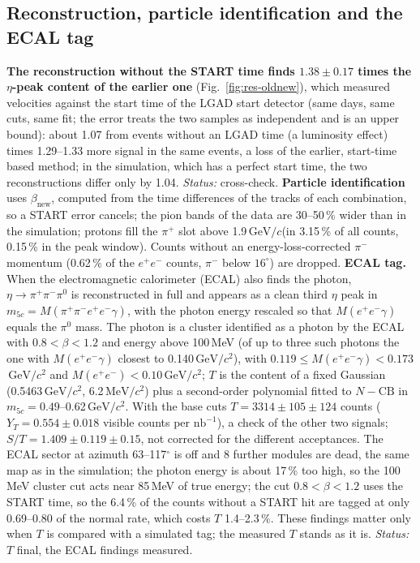 \documentclass[11pt,a4paper]{article}
\newcommand{\pip}{\ensuremath{\pi^{+}}\xspace}
\newcommand{\pim}{\ensuremath{\pi^{-}}\xspace}
\newcommand{\piz}{\ensuremath{\pi^{0}}\xspace}
\newcommand{\ee}{\ensuremath{e^{+}e^{-}}\xspace}
\newcommand{\pipi}{\ensuremath{\pi^{+}\pi^{-}}\xspace}
\newcommand{\ppee}{\ensuremath{\pi^{+}\pi^{-}e^{+}e^{-}}\xspace}
\newcommand{\Mee}{\ensuremath{M(e^{+}e^{-})}\xspace}
\newcommand{\betanew}{\ensuremath{\beta_{\mathrm{new}}}\xspace}
\newcommand{\nbinv}{\ensuremath{\mathrm{nb}^{-1}}\xspace}
\newcommand{\GeVc}{\ensuremath{\mathrm{GeV}/c}\xspace}
\newcommand{\GeVcc}{\ensuremath{\mathrm{GeV}/c^{2}}\xspace}
\newcommand{\MeVcc}{\ensuremath{\mathrm{MeV}/c^{2}}\xspace}
\begin{document}
\subsection{Reconstruction, particle identification and the ECAL tag}
\label{sec:prod}
\textbf{The reconstruction without the START time finds $1.38\pm0.17$ times the $\eta$-peak content of the earlier one}
(Fig.~\ref{fig:res-oldnew}), which measured velocities against the start time of the LGAD start detector (same days, same cuts, same fit;
the error treats the two samples as independent and is an upper bound): about 1.07 from events without an LGAD time (a luminosity effect)
times 1.29--1.33 more signal in the same events, a loss of the earlier, start-time based method; in the simulation, which has a perfect
start time, the two reconstructions differ only by 1.04. \emph{Status:} cross-check. \textbf{Particle identification} uses \betanew,
computed from the time differences of the tracks of each combination, so a START error cancels; the pion bands of the data are
30--50\,\% wider than in the simulation; protons fill the \pip slot above 1.9\,\GeVc (in 3.15\,\% of all counts, 0.15\,\% in the peak
window). Counts without an energy-loss-corrected \pim momentum (0.62\,\% of the \ee counts, \pim below $16^\circ$) are dropped.
\textbf{ECAL tag.} When the electromagnetic calorimeter (ECAL) also finds the photon, $\eta\to\pipi\piz$ is reconstructed in full and
appears as a clean third $\eta$ peak in $m_{5c}=M(\ppee\gamma)$, with the photon energy rescaled so that $M(\ee\gamma)$ equals the \piz
mass. The photon is a cluster identified as a photon by the ECAL with $0.8<\beta<1.2$ and energy above 100\,MeV (of up to three such
photons the one with $M(\ee\gamma)$ closest to 0.140\,\GeVcc), with $0.119\le M(\ee\gamma)<0.173$\,\GeVcc and $\Mee<0.10$\,\GeVcc; $T$ is the
content of a fixed Gaussian (0.5463\,\GeVcc, 6.2\,\MeVcc) plus a second-order polynomial fitted to $N-\mathrm{CB}$ in $m_{5c}=0.49$--0.62\,\GeVcc.
With the base cuts $T=3314\pm105\pm124$ counts ($Y_T=0.554\pm0.018$ visible counts per \nbinv), a check of the other two signals;
$S/T=1.409\pm0.119\pm0.15$, not corrected for the different acceptances. The ECAL sector at azimuth 63--117$^\circ$ is off and 8 further
modules are dead, the same map as in the simulation; the photon energy is about 17\,\% too high, so the 100\,MeV cluster cut acts near
85\,MeV of true energy; the cut $0.8<\beta<1.2$ uses the START time, so the 6.4\,\% of the counts without a START hit are tagged at only
0.69--0.80 of the normal rate, which costs $T$ 1.4--2.3\,\%. These findings matter only when $T$ is compared with a simulated tag; the
measured $T$ stands as it is. \emph{Status:} $T$ final, the ECAL findings measured.
\end{document}
